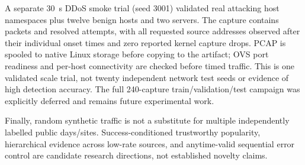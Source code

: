 
A separate 30~s DDoS smoke trial (seed 3001) validated \ScaleSources{} real attacking host namespaces plus twelve
benign hosts and two servers. The capture contains \ScalePackets{} packets and \ScaleAttempts{} resolved attempts,
with all requested source addresses observed after their individual onset times and zero reported kernel capture
drops. PCAP is spooled to native Linux storage before copying to the artifact; OVS port readiness and per-host
connectivity are checked before timed traffic. This is one validated scale trial, not twenty independent network
test seeds or evidence of high detection accuracy. The full 240-capture train/validation/test campaign was explicitly
deferred and remains future experimental work.

Finally, random synthetic traffic is not a substitute for multiple independently labelled public days/sites.
Success-conditioned trustworthy popularity, hierarchical evidence across low-rate sources, and anytime-valid
sequential error control are candidate research directions, not established novelty claims.
